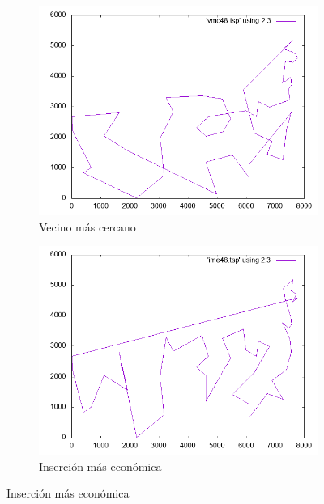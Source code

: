 \documentclass[12pt,spanish]{article}
\begin{document}
\begin{figure}[H]
\centering
\begin{subfigure}[b]{0.36\textwidth}
\includegraphics[width=\textwidth]{att48_vmc.png}
\caption{Vecino más cercano}
\end{subfigure}
\quad
\begin{subfigure}[b]{0.36\textwidth}
\includegraphics[width=\textwidth]{att48_ime.png}
\caption{Inserción más económica}
\end{subfigure}

\vspace{1cm}


\end{figure}
\end{document}
